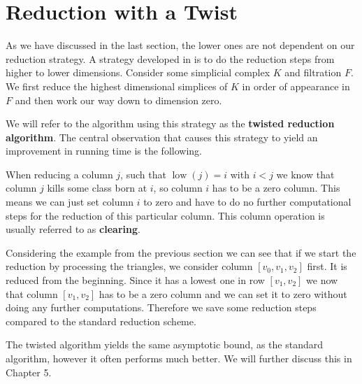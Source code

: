 \section{Reduction with a Twist}
\label{sec:twist}
As we have discussed in the last section, the lower ones are not dependent on our reduction strategy. A strategy developed in \cite{with_a_twist} is to do the reduction steps from higher to lower dimensions. Consider some simplicial complex $K$ and filtration $F$. We first reduce the highest dimensional simplices of $K$ in order of appearance in $F$ and then work our way down to dimension zero.

We will refer to the algorithm using this strategy as the \textbf{twisted reduction algorithm}.
The central observation that causes this strategy to yield an improvement in running time is the following. 

When reducing a column $j$, such that $\operatorname{low}(j) = i$ with $i<j$ we know that column $j$ kills some class born at $i$, so column $i$ has to be a zero column. This means we can just set column $i$ to zero and have to do no further computational steps for the reduction of this particular column. This column operation is usually referred to as \textbf{clearing}. 

Considering the example from the previous section we can see that if we start the reduction by processing the triangles, we consider column $[v_0,v_1,v_2]$ first. It is reduced from the beginning. Since it has a lowest one in row $[v_1,v_2]$ we now that column $[v_1,v_2]$ has to be a zero column and we can set it to zero without doing any further computations. Therefore we save some reduction steps compared to the standard reduction scheme.

The twisted algorithm yields the same asymptotic bound, as the standard algorithm, however it often performs much better. We will further discuss this in Chapter 5. 

